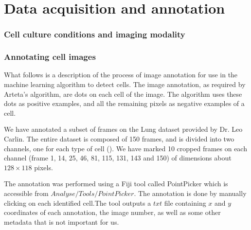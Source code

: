 \chapter{Data acquisition and annotation }
    \subsection{Cell culture conditions and imaging modality }
    \subsection{Annotating cell images }
    What follows is a description of the process of image annotation for use in the machine learning algorithm to detect cells. The image annotation, as required by Arteta's \cite{arteta12} algorithm, are dots on each cell of the image. The algorithm uses these dots as positive examples, and all the remaining pixels as negative examples of a cell.
    
    We have annotated a subset of frames on the Lung dataset provided by Dr. Leo Carlin. The entire dataset is composed of 150 frames, and is divided into two channels, one for each type of cell (). We have marked 10 cropped frames on each channel (frame 1, 14, 25, 46, 81, 115, 131, 143 and 150) of dimensions about $128\times118$ pixels.
    
    The annotation was performed using a Fiji \cite{fiji12} tool called PointPicker \cite{thevanez14} which is accessible from \(Analyse/Tools/PointPicker\). The annotation is done by manually clicking on each identified cell.The tool outputs a $txt$ file containing $x$ and $y$ coordinates of each annotation, the image number, as well as some other metadata that is not important for us.
    
